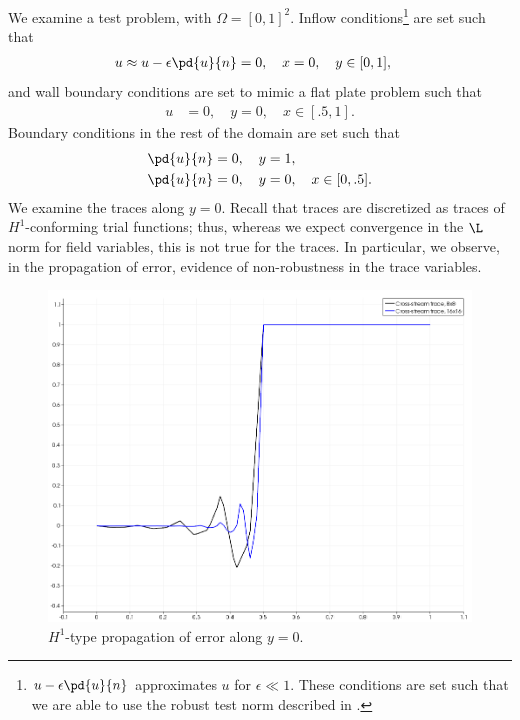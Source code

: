 We examine a test problem, with $\Omega = [0,1]^2$.  Inflow conditions\footnote{$u-\epsilon\pd{u}{n}$ approximates $u$ for $\epsilon\ll 1$.  These conditions are set such that we are able to use the robust test norm described in \cite{ChanHeuerBui-ThanhDemkowicz12}.} are set such that
\begin{align*}
u \approx u-\epsilon\pd{u}{n} &= 0,\quad x = 0,\quad y \in [0,1],
\end{align*}
and wall boundary conditions are set to mimic a flat plate problem such that
\begin{align*}
u &= 0,\quad y = 0,\quad x \in [.5,1].
\end{align*}
Boundary conditions in the rest of the domain are set such that
\begin{align*}
\pd{u}{n} &= 0,\quad y = 1,\\
\pd{u}{n} &= 0,\quad y = 0,\quad x \in [0,.5].
\end{align*}
We examine the traces along $y=0$.  Recall that traces are discretized as traces of $H^1$-conforming trial functions; thus, whereas we expect convergence in the $\L$ norm for field variables, this is not true for the traces.  In particular, we observe, in the propagation of error, evidence of non-robustness in the trace variables.  
\begin{figure}
\centering
\includegraphics[scale=.4]{figs/CrossTraces.png}
\caption{$H^1$-type propagation of error along $y = 0$.}
\end{figure}

